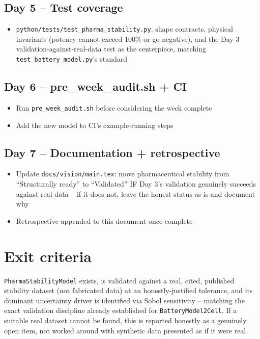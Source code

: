 \documentclass[11pt]{article}
\begin{document}
\subsection*{Day 5 -- Test coverage}
\begin{itemize}[leftmargin=*]
  \item \texttt{python/tests/test\_pharma\_stability.py}: shape
    contracts, physical invariants (potency cannot exceed 100\% or go
    negative), and the Day 3 validation-against-real-data test as the
    centerpiece, matching \texttt{test\_battery\_model.py}'s standard
\end{itemize}

\subsection*{Day 6 -- pre\_week\_audit.sh + CI}
\begin{itemize}[leftmargin=*]
  \item Run \texttt{pre\_week\_audit.sh} before considering the week
    complete
  \item Add the new model to CI's example-running steps
\end{itemize}

\subsection*{Day 7 -- Documentation + retrospective}
\begin{itemize}[leftmargin=*]
  \item Update \texttt{docs/vision/main.tex}: move pharmaceutical
    stability from ``Structurally ready'' to ``Validated'' IF Day 3's
    validation genuinely succeeds against real data -- if it does
    not, leave the honest status as-is and document why
  \item Retrospective appended to this document once complete
\end{itemize}

\section*{Exit criteria}
\texttt{PharmaStabilityModel} exists, is validated against a real,
cited, published stability dataset (not fabricated data) at an
honestly-justified tolerance, and its dominant uncertainty driver is
identified via Sobol sensitivity -- matching the exact validation
discipline already established for \texttt{BatteryModel2Cell}. If a
suitable real dataset cannot be found, this is reported honestly as a
genuinely open item, not worked around with synthetic data presented
as if it were real.
\end{document}
